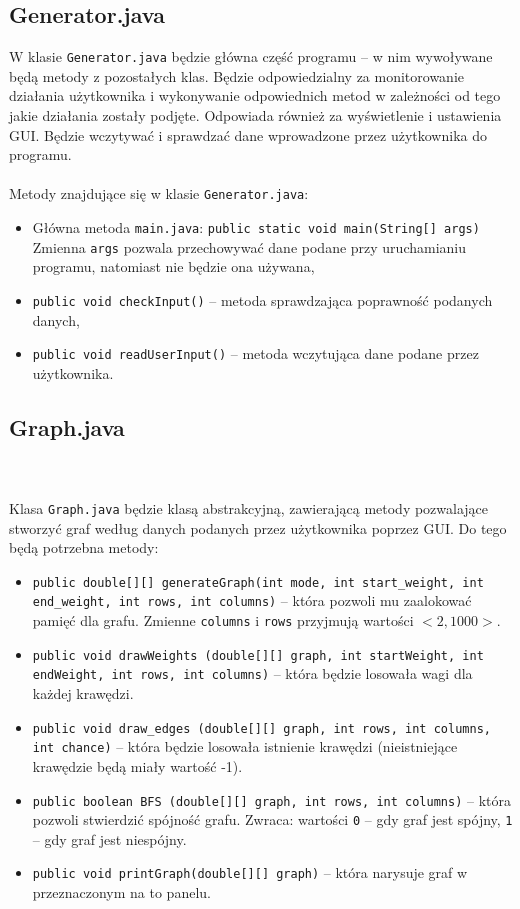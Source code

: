 \documentclass[12pt, a4paper]{article}
\begin{document}
\subsection{Generator.java}
W klasie \texttt{Generator.java} będzie główna część programu -- w nim wywoływane będą metody z pozostałych klas. Będzie odpowiedzialny za monitorowanie działania użytkownika i wykonywanie odpowiednich metod w zależności od tego jakie działania zostały podjęte. Odpowiada również za wyświetlenie i ustawienia GUI. Będzie wczytywać i sprawdzać dane wprowadzone przez użytkownika do programu.\\\\
Metody znajdujące się w klasie \texttt{Generator.java}:
\begin{itemize}
    \item Główna metoda \texttt{main.java}: \texttt{public static void main(String[] args)}\\
    Zmienna \texttt{args} pozwala przechowywać dane podane przy uruchamianiu    programu, natomiast nie będzie ona używana,
    \item \texttt{public void checkInput()} -- metoda sprawdzająca poprawność podanych danych,
    \item \texttt{public void readUserInput()} -- metoda wczytująca dane podane przez użytkownika.
\end{itemize}

\subsection{Graph.java}\\\\
Klasa \texttt{Graph.java} będzie klasą abstrakcyjną, zawierającą metody pozwalające stworzyć graf według danych podanych przez użytkownika poprzez GUI. Do tego będą potrzebna metody:
\begin{itemize}
    \item \texttt{public double[][] generateGraph(int mode, int start\_weight, int end\_weight, int rows, int columns)} -- która pozwoli mu zaalokować pamięć dla grafu. Zmienne \texttt{columns} i \texttt{rows} przyjmują wartości $<2,1000>$.
    \item \texttt{public void drawWeights (double[][] graph, int startWeight, int endWeight, int rows, int columns)} -- która będzie losowała wagi dla każdej krawędzi.
    \item \texttt{public void draw\_edges (double[][] graph, int rows, int columns, int chance)} -- która będzie losowała istnienie krawędzi (nieistniejące krawędzie będą miały wartość -1).
    \item \texttt{public boolean BFS (double[][] graph, int rows, int columns)} -- która pozwoli stwierdzić spójność grafu. Zwraca: wartości \texttt{0} -- gdy graf jest spójny, \texttt{1} -- gdy graf jest niespójny.
    \item \texttt{public void printGraph(double[][] graph)} -- która narysuje graf w przeznaczonym na to panelu.
\end{itemize}
\end{document}
